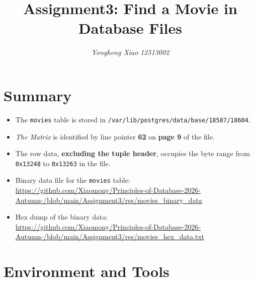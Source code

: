 \documentclass[10pt,a4paper]{article}
\title{Assignment3: Find a Movie in Database Files}
\author{\textit{Yongheng Xiao} \quad \textit{12513002}}
\date{}
\begin{document}
\maketitle

\section{Summary}

\begin{itemize}
    \item The \texttt{movies} table is stored in
          \texttt{/var/lib/postgres/data/base/18587/18604}.
    \item \textit{The Matrix} is identified by line pointer \textbf{62} on
          \textbf{page 9} of the file.
    \item The row data, \textbf{excluding the tuple header}, occupies the byte
          range from \texttt{0x13248} to \texttt{0x13263} in the file.
    \item Binary data file for the \texttt{movies} table:\\
          {\fontsize{7pt}{7pt}\url{https://github.com/Xiaomony/Principles-of-Database-2026-Autumn-/blob/main/Assignment3/res/movies_binary_data}}
    \item Hex dump of the binary data:\\
          {\fontsize{7pt}{7pt}\url{https://github.com/Xiaomony/Principles-of-Database-2026-Autumn-/blob/main/Assignment3/res/movies_hex_data.txt}}
\end{itemize}

\section{Environment and Tools}
\end{document}
